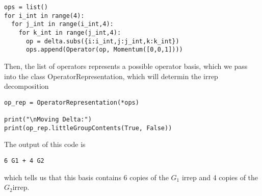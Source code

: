 \documentclass[12pt]{article}
\begin{document}
\begin{lstlisting}
ops = list()
for i_int in range(4):
  for j_int in range(i_int,4):
    for k_int in range(j_int,4):
      op = delta.subs({i:i_int,j:j_int,k:k_int})
      ops.append(Operator(op, Momentum([0,0,1])))
\end{lstlisting}

Then, the list of operators represents a possible operator basis, which we pass into
the class OperatorRepresentation, which will determin the irrep decomposition

\begin{lstlisting}
op_rep = OperatorRepresentation(*ops)

print("\nMoving Delta:")
print(op_rep.littleGroupContents(True, False))
\end{lstlisting}

The output of this code is

\begin{lstlisting}
6 G1 + 4 G2
\end{lstlisting}

which tells us that this basis contains 6 copies of the $G_1$ irrep and 4 copies of the $G_2$irrep.
\end{document}

